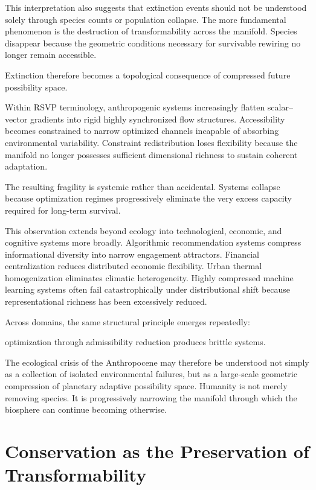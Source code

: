 \documentclass[11pt,a4paper]{article}
\begin{document}
This interpretation also suggests that extinction events should not be understood solely through species counts or population collapse. The more fundamental phenomenon is the destruction of transformability across the manifold. Species disappear because the geometric conditions necessary for survivable rewiring no longer remain accessible.

Extinction therefore becomes a topological consequence of compressed future possibility space.

Within RSVP terminology, anthropogenic systems increasingly flatten scalar--vector gradients into rigid highly synchronized flow structures. Accessibility becomes constrained to narrow optimized channels incapable of absorbing environmental variability. Constraint redistribution loses flexibility because the manifold no longer possesses sufficient dimensional richness to sustain coherent adaptation.

The resulting fragility is systemic rather than accidental. Systems collapse because optimization regimes progressively eliminate the very excess capacity required for long-term survival.

This observation extends beyond ecology into technological, economic, and cognitive systems more broadly. Algorithmic recommendation systems compress informational diversity into narrow engagement attractors. Financial centralization reduces distributed economic flexibility. Urban thermal homogenization eliminates climatic heterogeneity. Highly compressed machine learning systems often fail catastrophically under distributional shift because representational richness has been excessively reduced.

Across domains, the same structural principle emerges repeatedly:

optimization through admissibility reduction produces brittle systems.

The ecological crisis of the Anthropocene may therefore be understood not simply as a collection of isolated environmental failures, but as a large-scale geometric compression of planetary adaptive possibility space. Humanity is not merely removing species. It is progressively narrowing the manifold through which the biosphere can continue becoming otherwise.

\newpage

\section{Conservation as the Preservation of Transformability}
\end{document}

